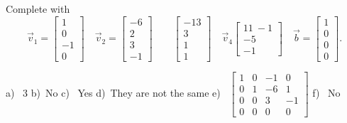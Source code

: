 \begin{exercise}
Complete  with
\begin{equation*}
\vec{v}_1 = \begin{bmatrix} 1 \\ 0 \\ -1 \\ 0 \end{bmatrix} \quad \vec{v}_2 = \begin{bmatrix} -6 \\ 2 \\ 3 \\ -1 \end{bmatrix} \qquad \begin{bmatrix} -13 \\ 3 \\ 1 \\ 1 \end{bmatrix} \quad \vec{v}_4 \begin{bmatrix} 11 \ -1 \\ -5 \\ -1 \end{bmatrix} \quad \vec{b} = \begin{bmatrix} 1 \\ 0 \\ 0 \\ 0 \end{bmatrix}. 
\end{equation*}
\end{exercise}
\comboSol{%
}
{%
a)~ 3 \quad b)~No \quad c)~ Yes \quad d)~They are not the same \quad
e)~ $\left[\begin{smallmatrix} 1 & 0 & -1 & 0 \\ 0 & 1 & -6 & 1 \\ 0 & 0 & 3 & -1 \\ 0 & 0 & 0 & 0 \end{smallmatrix}\right]$ \quad f)~ No
}


